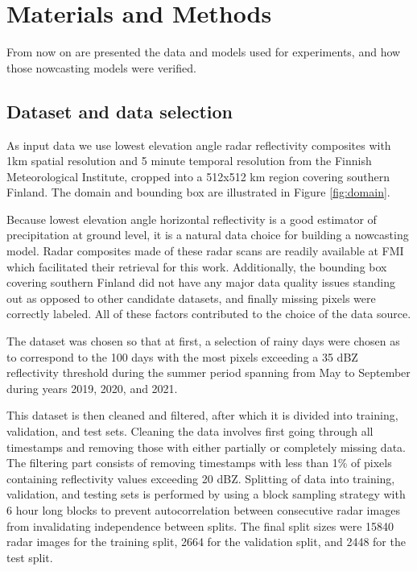 \chapter{Materials and Methods}
\label{chapter:methods}

From now on are presented the data and models used for experiments, and how those nowcasting models were verified. 

\section{Dataset and data selection}
\label{section:data}

As input data we use lowest elevation angle radar reflectivity composites with 1km spatial resolution and 5 minute temporal resolution from the Finnish Meteorological Institute, cropped into a 512x512 km region covering southern Finland. The domain and bounding box are illustrated in Figure \ref{fig:domain}.

Because lowest elevation angle horizontal reflectivity is a good estimator of precipitation at ground level, it is a natural data choice for building a nowcasting model. Radar composites made of these radar scans are readily available at FMI which facilitated their retrieval for this work. Additionally, the bounding box covering southern Finland did not have any major data quality issues standing out as opposed to other candidate datasets, and finally missing pixels were correctly labeled. All of these factors contributed to the choice of the data source. 


The dataset was chosen so that at first, a selection of rainy days were chosen as to correspond to the 100 days with the most pixels exceeding a 35 dBZ reflectivity threshold during the summer period spanning from May to September during years 2019, 2020, and 2021. 

This dataset is then cleaned and filtered, after which it is divided into training, validation, and test sets. Cleaning the data involves first going through all timestamps and removing those with either partially or completely missing data. The filtering part consists of removing timestamps with less than 1\% of pixels containing reflectivity values exceeding 20 dBZ. Splitting of data into training, validation, and testing sets is performed by using a block sampling strategy \cite{schultz_can_2021} with 6 hour long blocks to prevent autocorrelation between consecutive radar images from invalidating independence between splits. The final split sizes were 15840 radar images for the training split, 2664 for the validation split, and 2448 for the test split. 

